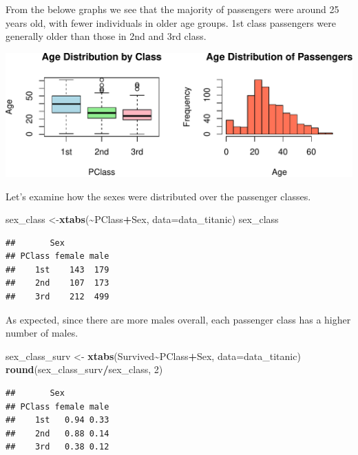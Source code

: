 \documentclass[
  11pt,
]{article}
\newenvironment{Shaded}{\begin{snugshade}}{\end{snugshade}}
\newcommand{\AttributeTok}[1]{\textcolor[rgb]{0.13,0.29,0.53}{#1}}
\newcommand{\DecValTok}[1]{\textcolor[rgb]{0.00,0.00,0.81}{#1}}
\newcommand{\FunctionTok}[1]{\textcolor[rgb]{0.13,0.29,0.53}{\textbf{#1}}}
\newcommand{\NormalTok}[1]{#1}
\newcommand{\OtherTok}[1]{\textcolor[rgb]{0.56,0.35,0.01}{#1}}
\newcommand{\SpecialCharTok}[1]{\textcolor[rgb]{0.81,0.36,0.00}{\textbf{#1}}}
\begin{document}
From the belowe graphs we see that the majority of passengers were
around 25 years old, with fewer individuals in older age groups. 1st
class passengers were generally older than those in 2nd and 3rd class.

\includegraphics{ReportAssignment2_files/figure-latex/unnamed-chunk-3-1.pdf}

Let's examine how the sexes were distributed over the passenger classes.

\begin{Shaded}
\begin{Highlighting}[]
\NormalTok{sex\_class }\OtherTok{\textless{}{-}}\FunctionTok{xtabs}\NormalTok{(}\SpecialCharTok{\textasciitilde{}}\NormalTok{PClass}\SpecialCharTok{+}\NormalTok{Sex, }\AttributeTok{data=}\NormalTok{data\_titanic)}
\NormalTok{sex\_class}
\end{Highlighting}
\end{Shaded}

\begin{verbatim}
##       Sex
## PClass female male
##    1st    143  179
##    2nd    107  173
##    3rd    212  499
\end{verbatim}

As expected, since there are more males overall, each passenger class
has a higher number of males.

\begin{Shaded}
\begin{Highlighting}[]
\NormalTok{sex\_class\_surv }\OtherTok{\textless{}{-}} \FunctionTok{xtabs}\NormalTok{(Survived}\SpecialCharTok{\textasciitilde{}}\NormalTok{PClass}\SpecialCharTok{+}\NormalTok{Sex, }\AttributeTok{data=}\NormalTok{data\_titanic)}
\FunctionTok{round}\NormalTok{(sex\_class\_surv}\SpecialCharTok{/}\NormalTok{sex\_class, }\DecValTok{2}\NormalTok{)}
\end{Highlighting}
\end{Shaded}

\begin{verbatim}
##       Sex
## PClass female male
##    1st   0.94 0.33
##    2nd   0.88 0.14
##    3rd   0.38 0.12
\end{verbatim}
\end{document}
